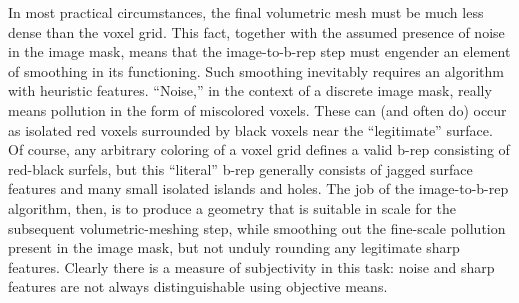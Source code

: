 In most practical circumstances, the final volumetric mesh
must be much less dense than the voxel grid.  This fact, together with the assumed presence of noise in the image mask, means that the image-to-b-rep step must engender an element of smoothing in its functioning.  Such smoothing inevitably requires an algorithm with heuristic features.  ``Noise,'' in the context of a discrete image mask, really means pollution in the form of miscolored voxels.  These can (and often do) occur as isolated red voxels surrounded by black voxels near the ``legitimate'' surface.  Of course, any arbitrary coloring of a voxel grid defines a valid b-rep consisting of red-black surfels, but this ``literal'' b-rep generally consists of jagged surface features and many small isolated islands and holes.  The job of the image-to-b-rep algorithm, then, is to produce a geometry that is suitable in scale for the subsequent volumetric-meshing step, while smoothing out the fine-scale pollution present in the image mask, but not unduly rounding any legitimate sharp features.  Clearly there is a measure of subjectivity in this task:  noise and sharp features are not always distinguishable using objective means.
